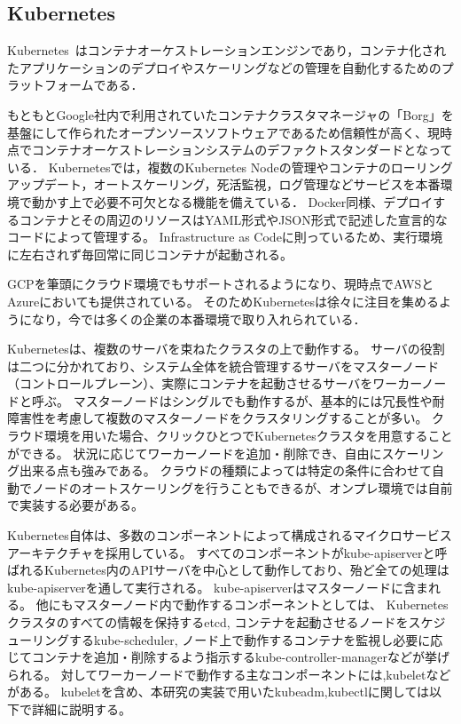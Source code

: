 \subsection{Kubernetes}
\label{background:kubernetes}

Kubernetes~\cite{Kubernetes}はコンテナオーケストレーションエンジンであり，コンテナ化されたアプリケーションのデプロイやスケーリングなどの管理を自動化するためのプラットフォームである．

もともとGoogle社内で利用されていたコンテナクラスタマネージャの「Borg」を基盤にして作られたオープンソースソフトウェアであるため信頼性が高く、現時点でコンテナオーケストレーションシステムのデファクトスタンダードとなっている．
Kubernetesでは，複数のKubernetes Nodeの管理やコンテナのローリングアップデート，オートスケーリング，死活監視，ログ管理などサービスを本番環境で動かす上で必要不可欠となる機能を備えている．
Docker同様、デプロイするコンテナとその周辺のリソースはYAML形式やJSON形式で記述した宣言的なコードによって管理する。
Infrastructure as Codeに則っているため、実行環境に左右されず毎回常に同じコンテナが起動される。

GCPを筆頭にクラウド環境でもサポートされるようになり、現時点でAWSとAzureにおいても提供されている。
そのためKubernetesは徐々に注目を集めるようになり，今では多くの企業の本番環境で取り入れられている．

Kubernetesは、複数のサーバを束ねたクラスタの上で動作する。
サーバの役割は二つに分かれており、システム全体を統合管理するサーバをマスターノード（コントロールプレーン）、実際にコンテナを起動させるサーバをワーカーノードと呼ぶ。
マスターノードはシングルでも動作するが、基本的には冗長性や耐障害性を考慮して複数のマスターノードをクラスタリングすることが多い。
クラウド環境を用いた場合、クリックひとつでKubernetesクラスタを用意することができる。
状況に応じてワーカーノードを追加・削除でき、自由にスケーリング出来る点も強みである。
クラウドの種類によっては特定の条件に合わせて自動でノードのオートスケーリングを行うこともできるが、オンプレ環境では自前で実装する必要がある。

Kubernetes自体は、多数のコンポーネントによって構成されるマイクロサービスアーキテクチャを採用している。
すべてのコンポーネントがkube-apiserverと呼ばれるKubernetes内のAPIサーバを中心として動作しており、殆ど全ての処理はkube-apiserverを通して実行される。
kube-apiserverはマスターノードに含まれる。
他にもマスターノード内で動作するコンポーネントとしては、
Kubernetesクラスタのすべての情報を保持するetcd,
コンテナを起動させるノードをスケジューリングするkube-scheduler,
ノード上で動作するコンテナを監視し必要に応じてコンテナを追加・削除するよう指示するkube-controller-managerなどが挙げられる。
対してワーカーノードで動作する主なコンポーネントには,kubeletなどがある。
kubeletを含め、本研究の実装で用いたkubeadm,kubectlに関しては以下で詳細に説明する。


